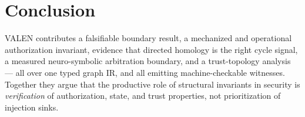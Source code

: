 \documentclass[11pt]{article}
\begin{document}
\section{Conclusion}
VALEN contributes a falsifiable boundary result, a mechanized and operational
authorization invariant, evidence that directed homology is the right cycle
signal, a measured neuro-symbolic arbitration boundary, and a trust-topology
analysis --- all over one typed graph IR, and all emitting machine-checkable
witnesses. Together they argue that the productive role of structural invariants
in security is \emph{verification} of authorization, state, and trust properties,
not prioritization of injection sinks.
\end{document}
